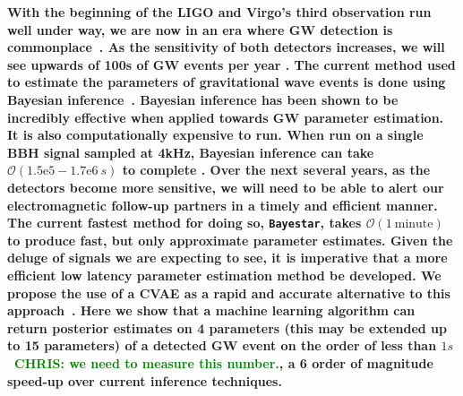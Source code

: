 \documentclass[%
showpacs,
 amsmath,amssymb,
 aps,
 twocolumn,
 prl,
 reprint,
floatfix,
]{revtex4-1}
\newcommand{\chris}[1]{\textbf{\textcolor{green}{CHRIS: #1}}}
\begin{document}
%
%
%
\textbf{ 
%
%
With the beginning of the \ac{LIGO} and
Virgo's third observation run well under way, we are now in an era where
\ac{GW} detection is commonplace~\cite{PhysRevLett.116.061102,
PhysRevX.6.041015,PhysRevLett.119.161101}. As the sensitivity of both detectors
increases, we will see upwards of 100s of \ac{GW} events per year \cite{1409.7215}.  The current
method used to estimate the parameters of gravitational wave events is done
using Bayesian inference~\cite{1409.7215}.
%
%
Bayesian inference has been shown to be incredibly effective when 
applied towards \ac{GW} parameter estimation. It is also computationally expensive 
to run. When run on a single \ac{BBH} signal sampled at 4kHz, Bayesian 
inference can take $\mathcal{O}(1.5\textrm{e}5 - 1.7\textrm{e}6\: s)$ to complete \cite{1409.7215}. 
Over the next several years, as the detectors become more sensitive, we will 
need to be able to alert our electromagnetic follow-up partners in a timely 
and efficient manner. The current fastest method for doing so, \texttt{Bayestar}, 
takes $\mathcal{O}(1\: \textrm{minute})$ to produce fast, but only approximate parameter estimates. 
Given the deluge of signals we are expecting to see, 
it is imperative that a more efficient low latency parameter estimation 
method be developed. We propose the use of a \ac{CVAE} as a rapid and accurate alternative to this
approach~\cite{1904.06264,1812.04405}. 
%
%
Here we show that a machine learning algorithm can return
posterior estimates on 4 parameters (this may be extended up to 15 parameters) of a detected \ac{GW} event on the order of less
than $1s$~\chris{we need to measure this number.}, a 6 order of magnitude speed-up over
current inference techniques.}
\end{document}
